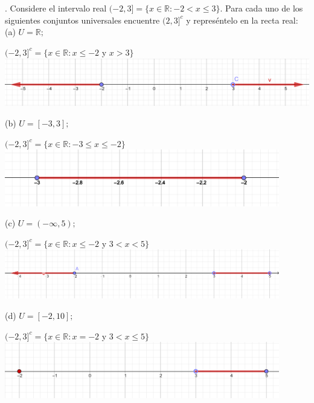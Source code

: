 \section{}
. Considere el intervalo real $(-2,3] = \{x \in \mathbb{R} : -2 < x \leq 3\}.$ Para cada uno de los siguientes conjuntos universales encuentre $(2,3]^c$ y represéntelo en la recta real:\\
 
(a) $U = \mathbb{R};$
\begin{center}
$(-2,3]^c = \{x \in \mathbb{R} : x \leq -2$ y $x>3\}$\\
\includegraphics[scale=1]{img/problema_a.png} 
\end{center}
(b) $U = [-3,3];$

\begin{center}
$(-2,3]^c = \{x \in \mathbb{R} : -3 \leq x \leq -2\}$\\
\includegraphics[width=12cm]{img/problema_b.png} 
\end{center}
(c) $U = (-\infty,5);$

\begin{center}
$(-2,3]^c = \{x \in \mathbb{R} : x \leq -2$ y $3 < x < 5\}$\\
\includegraphics[width=12cm]{img/problema_c.png} 
\end{center}
(d) $U = [-2,10];$

\begin{center}
$(-2,3]^c = \{x \in \mathbb{R} : x = -2$ y $3 < x \leq 5\}$\\
\includegraphics[width=12cm]{img/probema_d.png} 
\end{center}